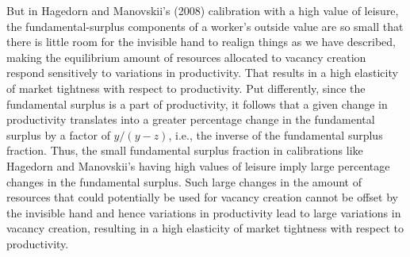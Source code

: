  
But in Hagedorn and Manovskii's (2008)  calibration with a high value of
leisure,
the fundamental-surplus components of a worker's outside
value are so small that there is little room for the invisible hand to  realign things as we have described,
making the equilibrium amount
of resources allocated to vacancy creation respond
sensitively to variations in productivity.
That  results in a high
elasticity of market tightness with respect to productivity. Put
differently, since the fundamental surplus is a part of
productivity, it follows that a given change
in productivity translates into  a greater percentage change in
the fundamental surplus by a factor of $y/(y-z)$, i.e., the
inverse of the fundamental surplus fraction. Thus, the small
fundamental surplus fraction in  calibrations
like Hagedorn and Manovskii's having high values of leisure imply large percentage
changes in the fundamental surplus. Such large changes in the
amount of resources that could potentially be used for
vacancy creation cannot be offset by the invisible hand
and hence variations in productivity lead to
large variations in vacancy creation, resulting in a high
elasticity of market tightness with respect to
productivity.

